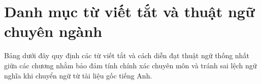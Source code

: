 
\chapter*{Danh mục từ viết tắt và thuật ngữ chuyên ngành}
{}

Bảng dưới đây quy định các từ viết tắt và cách diễn đạt thuật ngữ thống nhất giữa các chương nhằm bảo đảm tính chính xác chuyên môn và tránh sai lệch ngữ nghĩa khi chuyển ngữ từ tài liệu gốc tiếng Anh.

